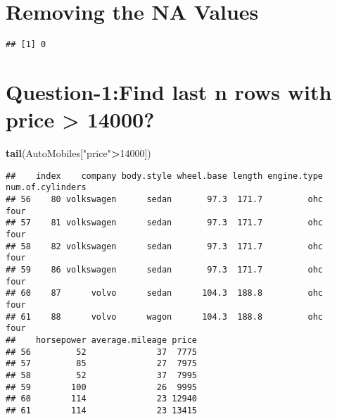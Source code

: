 \documentclass[
]{article}
\newenvironment{Shaded}{\begin{snugshade}}{\end{snugshade}}
\newcommand{\AttributeTok}[1]{\textcolor[rgb]{0.13,0.29,0.53}{#1}}
\newcommand{\DecValTok}[1]{\textcolor[rgb]{0.00,0.00,0.81}{#1}}
\newcommand{\FunctionTok}[1]{\textcolor[rgb]{0.13,0.29,0.53}{\textbf{#1}}}
\newcommand{\NormalTok}[1]{#1}
\newcommand{\OtherTok}[1]{\textcolor[rgb]{0.56,0.35,0.01}{#1}}
\newcommand{\SpecialCharTok}[1]{\textcolor[rgb]{0.81,0.36,0.00}{\textbf{#1}}}
\newcommand{\StringTok}[1]{\textcolor[rgb]{0.31,0.60,0.02}{#1}}
\begin{document}
\hypertarget{removing-the-na-values}{%
\section{Removing the NA Values}\label{removing-the-na-values}}

\begin{Shaded}
\end{Shaded}

\begin{verbatim}
## [1] 0
\end{verbatim}

\hypertarget{question-1find-last-n-rows-with-price-14000}{%
\section{Question-1:Find last n rows with price \textgreater{}
14000?}\label{question-1find-last-n-rows-with-price-14000}}

\begin{Shaded}
\begin{Highlighting}[]
\FunctionTok{tail}\NormalTok{(AutoMobiles[}\StringTok{"price"}\SpecialCharTok{\textgreater{}}\DecValTok{14000}\NormalTok{])}
\end{Highlighting}
\end{Shaded}

\begin{verbatim}
##    index    company body.style wheel.base length engine.type num.of.cylinders
## 56    80 volkswagen      sedan       97.3  171.7         ohc             four
## 57    81 volkswagen      sedan       97.3  171.7         ohc             four
## 58    82 volkswagen      sedan       97.3  171.7         ohc             four
## 59    86 volkswagen      sedan       97.3  171.7         ohc             four
## 60    87      volvo      sedan      104.3  188.8         ohc             four
## 61    88      volvo      wagon      104.3  188.8         ohc             four
##    horsepower average.mileage price
## 56         52              37  7775
## 57         85              27  7975
## 58         52              37  7995
## 59        100              26  9995
## 60        114              23 12940
## 61        114              23 13415
\end{verbatim}
\end{document}

